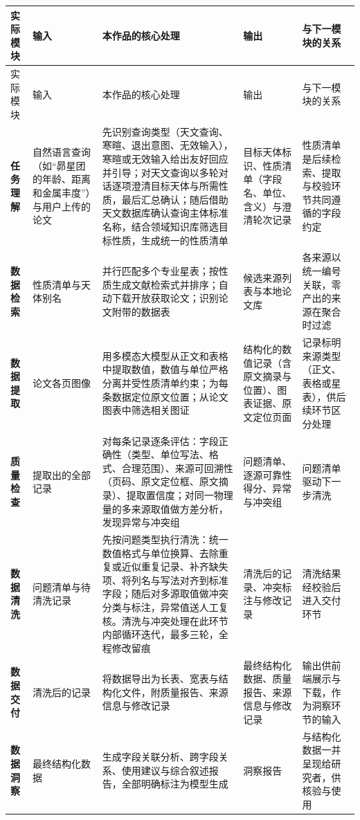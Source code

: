 \begin{longtable}{@{}p{1.7cm}p{2.1cm}p{6.2cm}p{2.4cm}p{2.2cm}@{}}
\toprule
实际模块 & 输入 & 本作品的核心处理 & 输出 & 与下一模块的关系 \\
\midrule
\endfirsthead
\toprule
实际模块 & 输入 & 本作品的核心处理 & 输出 & 与下一模块的关系 \\
\midrule
\endhead
\textbf{任务理解} & 自然语言查询（如“昴星团的年龄、距离和金属丰度”）与用户上传的论文 & 先识别查询类型（天文查询、寒暄、退出意图、无效输入），寒暄或无效输入给出友好回应并引导；对天文查询以多轮对话逐项澄清目标天体与所需性质，最后汇总确认；随后借助天文数据库确认查询主体标准名称，结合领域知识库筛选目标性质，生成统一的性质清单 & 目标天体标识、性质清单（字段名、单位、含义）与澄清轮次记录 & 性质清单是后续检索、提取与校验环节共同遵循的字段约定 \\
\textbf{数据检索} & 性质清单与天体别名 & 并行匹配多个专业星表；按性质生成文献检索式并排序；自动下载开放获取论文；识别论文附带的数据表 & 候选来源列表与本地论文库 & 各来源以统一编号关联，零产出的来源在聚合时过滤 \\
\textbf{数据提取} & 论文各页图像 & 用多模态大模型从正文和表格中提取数值，数值与单位严格分离并受性质清单约束；为每条数据定位原文位置；从论文图表中筛选相关图证 & 结构化的数值记录（含原文摘录与位置）、图表证据、原文定位页面 & 记录标明来源类型（正文、表格或星表），供后续环节区分处理 \\
\textbf{质量检查} & 提取出的全部记录 & 对每条记录逐条评估：字段正确性（类型、单位写法、格式、合理范围）、来源可回溯性（页码、原文定位框、原文摘录）、提取置信度；对同一物理量的多来源取值做方差分析，发现异常与冲突组 & 问题清单、逐源可靠性得分、异常与冲突组 & 问题清单驱动下一步清洗 \\
\textbf{数据清洗} & 问题清单与待清洗记录 & 先按问题类型执行清洗：统一数值格式与单位换算、去除重复或近似重复记录、补齐缺失项、将列名与写法对齐到标准字段；随后对多源取值做冲突分类与标注，异常值送人工复核。清洗与冲突处理在此环节内部循环迭代，最多三轮，全程修改留痕 & 清洗后的记录、冲突标注与修改记录 & 清洗结果经校验后进入交付环节 \\
\textbf{数据交付} & 清洗后的记录 & 将数据导出为长表、宽表与结构化文件，附质量报告、来源信息与修改记录 & 最终结构化数据、质量报告、来源信息与修改记录 & 输出供前端展示与下载，作为洞察环节的输入 \\
\textbf{数据洞察} & 最终结构化数据 & 生成字段关联分析、跨字段关系、使用建议与综合叙述报告，全部明确标注为模型生成 & 洞察报告 & 与结构化数据一并呈现给研究者，供核验与使用 \\
\bottomrule
\end{longtable}

